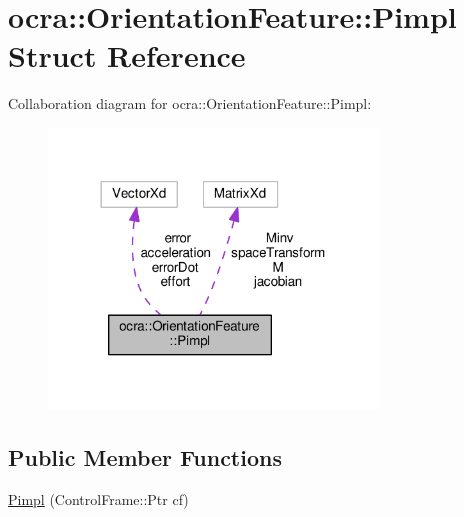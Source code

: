 \hypertarget{structocra_1_1OrientationFeature_1_1Pimpl}{}\section{ocra\+:\+:Orientation\+Feature\+:\+:Pimpl Struct Reference}
\label{structocra_1_1OrientationFeature_1_1Pimpl}


Collaboration diagram for ocra\+:\+:Orientation\+Feature\+:\+:Pimpl\+:
\nopagebreak
\begin{figure}[H]
\begin{center}
\leavevmode
\includegraphics[width=249pt]{d4/dde/structocra_1_1OrientationFeature_1_1Pimpl__coll__graph}
\end{center}
\end{figure}
\subsection*{Public Member Functions}
\begin{DoxyCompactItemize}
\item 
\hyperlink{structocra_1_1OrientationFeature_1_1Pimpl_aa5a7e987e6c60ebd03c2acb696f85258}{Pimpl} (Control\+Frame\+::\+Ptr cf)
\end{DoxyCompactItemize}
